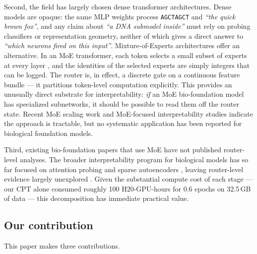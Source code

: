 \documentclass[11pt]{article}
\begin{document}
Second, the field has largely chosen dense transformer architectures. Dense models are opaque: the same MLP weights process \texttt{AGCTAGCT} and \emph{``the quick brown fox''}, and any claim about \emph{``a DNA submodel inside''} must rely on probing classifiers or representation geometry, neither of which gives a direct answer to \emph{``which neurons fired on this input''}. Mixture-of-Experts architectures \citep{shazeer2017sparse, fedus2022switch, zoph2022designing, jiang2024mixtral} offer an alternative. In an MoE transformer, each token selects a small subset of experts at every layer \citep{vaswani2017attention}, and the identities of the selected experts are simply integers that can be logged. The router is, in effect, a discrete gate on a continuous feature bundle --- it partitions token-level computation explicitly. This provides an unusually direct substrate for interpretability: \emph{if} an MoE bio-foundation model has specialized subnetworks, it should be possible to read them off the router state. Recent MoE scaling work \citep{dai2024deepseekmoe, liu2024deepseekv2, wang2024loadbalance} and MoE-focused interpretability studies \citep{park2024moeinterpret} indicate the approach is tractable, but no systematic application has been reported for biological foundation models.

Third, existing bio-foundation papers that use MoE have not published router-level analyses. The broader interpretability program for biological models has so far focused on attention probing \citep{adams2025scfminterp} and sparse autoencoders \citep{templeton2024scaling, bricken2023monosemanticity}, leaving router-level evidence largely unexplored \citep{cai2024moesurvey}. Given the substantial compute cost of each stage --- our CPT alone consumed roughly 100 H20-GPU-hours for 0.6 epochs on 32.5\,GB of data --- this decomposition has immediate practical value.

\subsection*{Our contribution}

This paper makes three contributions.
\end{document}
